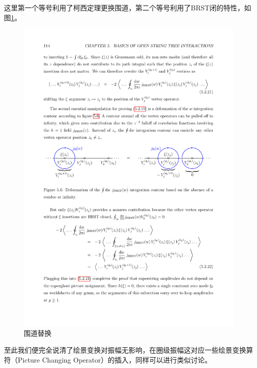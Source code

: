 这里第一个等号利用了柯西定理更换围道，第二个等号利用了BRST闭的特性，如图\ref{fig:2}。
\begin{figure}[htbp]
	\centering
	\includegraphics[width=\linewidth]{figs/fig2.pdf}
	\caption{围道替换}
	\label{fig:2}
\end{figure}

至此我们便完全说清了绘景变换对振幅无影响，在圈级振幅这对应一些绘景变换算符（Picture Changing Operator）的插入，同样可以进行类似讨论。\cite{Polchinski:1998rr}
